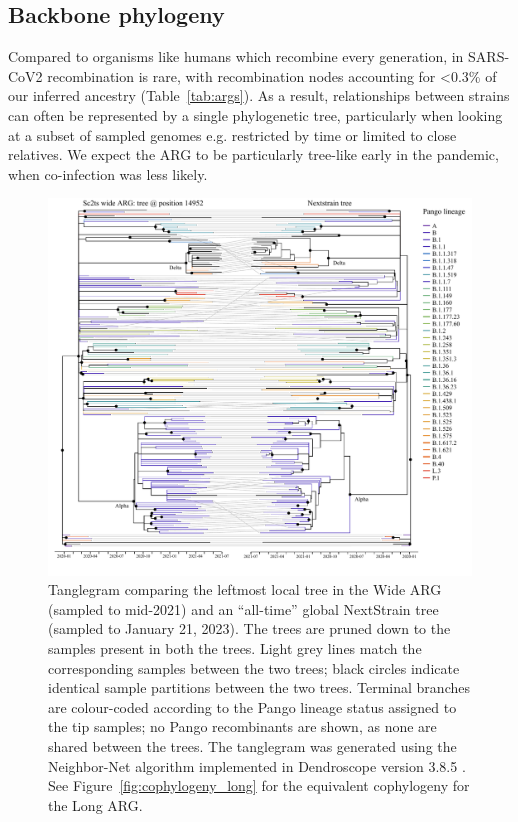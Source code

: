 \documentclass{article}
\begin{document}
\subsection{Backbone phylogeny}
\label{sec:backbone_phylogeny}
Compared to organisms like humans which recombine every generation,
in SARS-CoV2 recombination is rare, with recombination nodes accounting
for <0.3\% of our inferred ancestry (Table~\ref{tab:args}). As a result,
relationships between strains can often be represented by a
single phylogenetic tree, particularly when looking at
a subset of sampled genomes e.g. restricted by time or limited to close
relatives. We expect the ARG to be particularly tree-like
early in the pandemic, when co-infection was less likely.
\begin{figure} \centering
\includegraphics[width=\textwidth]{figures/cophylogeny_wide.pdf}
\caption{\label{fig:cophylogeny}
Tanglegram comparing the leftmost local tree in the Wide ARG
(sampled to mid-2021)
and an ``all-time'' global NextStrain tree (sampled to January 21, 2023). The
trees are pruned down to the samples present in both the trees. Light grey
lines match the corresponding samples between the two trees; black circles
indicate identical sample partitions between the two trees. Terminal branches
are colour-coded according to the Pango lineage status assigned to the tip
samples; no Pango recombinants are shown, as none are shared between the trees.
The tanglegram was generated using the Neighbor-Net algorithm
\citep{Scornavacca2011-mg} implemented in Dendroscope version 3.8.5
\citep{Huson2012-ys}. See Figure~\ref{fig:cophylogeny_long} for the equivalent
cophylogeny for the Long ARG.}
\end{figure}
\end{document}
